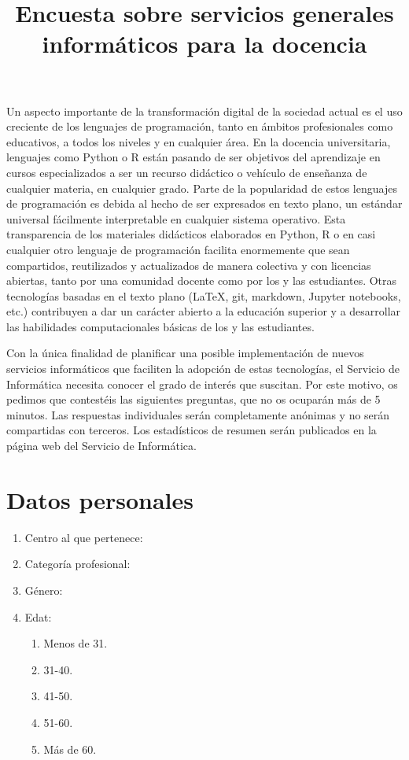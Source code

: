 \documentclass[a4paper,12pt]{article}
\title{Encuesta sobre servicios generales informáticos para la docencia}
\newcounter{preg}[section]
\begin{document}
\maketitle
Un aspecto importante de la transformación digital de la sociedad actual es el uso creciente
de los lenguajes de programación, tanto en ámbitos profesionales como educativos, a todos
los niveles y en cualquier área. En la docencia universitaria, lenguajes como Python o R
están pasando de ser objetivos del aprendizaje en cursos especializados a ser un recurso
didáctico o vehículo de enseñanza de cualquier materia, en cualquier grado. Parte de la
popularidad de estos lenguajes de programación es debida al hecho de ser expresados en
texto plano, un estándar universal fácilmente interpretable en cualquier sistema operativo.
Esta transparencia de los materiales didácticos elaborados en Python, R o en casi cualquier
otro lenguaje de programación facilita enormemente que sean compartidos, reutilizados y
actualizados de manera colectiva y con licencias abiertas, tanto por una comunidad docente
como por los y las estudiantes. Otras tecnologías basadas en el texto plano (\LaTeX, git,
markdown, Jupyter notebooks, etc.) contribuyen a dar un carácter abierto a la educación
superior y a desarrollar las habilidades computacionales básicas de los y las estudiantes.

Con la única finalidad de planificar una posible implementación de nuevos servicios
informáticos que faciliten la adopción de estas tecnologías, el Servicio de Informática
necesita conocer el grado de interés que suscitan. Por este motivo, os pedimos que
contestéis las siguientes preguntas, que no os ocuparán más de 5 minutos. Las respuestas
individuales serán completamente anónimas y no serán compartidas con terceros. Los estadísticos
de resumen serán publicados en la página web del Servicio de Informática.

\section{Datos personales}
\setcounter{preg}{1}

\begin{enumerate}
\item {} Centro al que pertenece:
\item {} Categoría profesional:
\item {} Género:
\item {} Edat:
   \begin{enumerate}
   \item Menos de 31.
   \item 31-40.
   \item 41-50.
   \item 51-60.
   \item Más de 60.
   \end{enumerate}
\end{enumerate}
\end{document}
